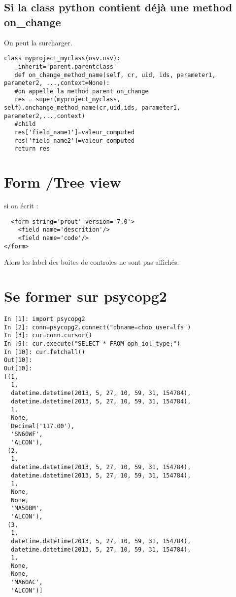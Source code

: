 \documentclass[12pt,a4paper]{article}
\begin{document}
\subsection{Si la class python contient déjà une method on\_change}
\label{sec:override}

On peut la surcharger.
\begin{verbatim}
class myproject_myclass(osv.osv):
   _inherit='parent.parentclass'
   def on_change_method_name(self, cr, uid, ids, parameter1, parameter2, ...,context=None):
   #on appelle la method parent on_change
   res = super(myproject_myclass, self).onchange_method_name(cr,uid,ids, parameter1, parameter2,...,context)
   #child
   res['field_name1']=valeur_computed
   res['field_name2']=valeur_computed
   return res
\end{verbatim}


\section{Form /Tree view}
\label{sec:views}

si on écrit : 
\begin{verbatim}
  <form string='prout' version='7.0'> 
    <field name='descrition'/> 
    <field name='code'/> 
</form>
\end{verbatim}


Alors les label des boites de controles ne sont pas affichés. 



\section{Se former sur psycopg2}
\label{psycopg2}

\begin{verbatim}
In [1]: import psycopg2
In [2]: conn=psycopg2.connect("dbname=choo user=lfs")
In [3]: cur=conn.cursor()
In [9]: cur.execute("SELECT * FROM oph_iol_type;")
In [10]: cur.fetchall()
Out[10]: 
Out[10]: 
[(1,
  1,
  datetime.datetime(2013, 5, 27, 10, 59, 31, 154784),
  datetime.datetime(2013, 5, 27, 10, 59, 31, 154784),
  1,
  None,
  Decimal('117.00'),
  'SN60WF',
  'ALCON'),
 (2,
  1,
  datetime.datetime(2013, 5, 27, 10, 59, 31, 154784),
  datetime.datetime(2013, 5, 27, 10, 59, 31, 154784),
  1,
  None,
  None,
  'MA50BM',
  'ALCON'),
 (3,
  1,
  datetime.datetime(2013, 5, 27, 10, 59, 31, 154784),
  datetime.datetime(2013, 5, 27, 10, 59, 31, 154784),
  1,
  None,
  None,
  'MA60AC',
  'ALCON')]
\end{verbatim}
\end{document}
